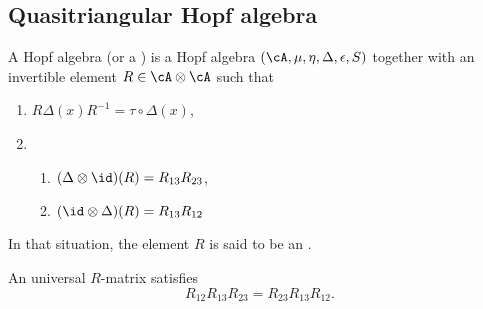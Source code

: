 \subsection{Quasitriangular Hopf algebra}

\begin{definition}
    A  Hopf algebra (or a ) is a Hopf algebra $(\cA,\mu,\eta,\Delta,\epsilon,S)$ together with an invertible element $R\in\cA\otimes\cA$ such that 
\begin{enumerate}
\item $R\Delta(x)R^{-1}=\tau\circ\Delta(x)$,\label{ItemCondUnifRi}
\item
\begin{enumerate}
\item $(\Delta\otimes\id)(R)=R_{13}R_{23}$,
\item $(\id\otimes\Delta)(R)=R_{13}R_{12}$\label{ItemCondUnifRiib}
\end{enumerate}

\end{enumerate}
In that situation, the element $R$ is said to be an .
\end{definition}


\begin{theorem}
An universal $R$-matrix satisfies
\begin{equation}
R_{12}R_{13}R_{23}=R_{23}R_{13}R_{12}.
\end{equation}

\end{theorem}

